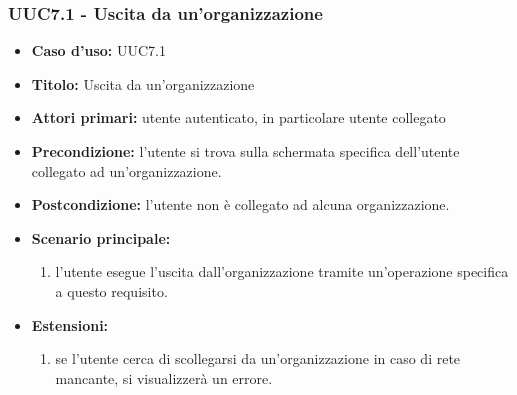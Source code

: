 \documentclass[casi-duso]{subfiles}
\begin{document}
\subsubsection{UUC7.1 - Uscita da un'organizzazione}
\label{subsub:UUC7.1utente}
\begin{itemize}
  \item \textbf{Caso d’uso:} UUC7.1
  \item \textbf{Titolo:} Uscita da un'organizzazione
  \item \textbf{Attori primari:} utente autenticato, in particolare utente collegato
  \item \textbf{Precondizione:} l'utente si trova sulla schermata specifica dell'utente collegato ad un'organizzazione.
  \item \textbf{Postcondizione:} l'utente non è collegato ad alcuna organizzazione.
  \item \textbf{Scenario principale:} 
  \begin{enumerate}
    \item l'utente esegue l'uscita dall'organizzazione tramite un'operazione specifica a questo requisito.
  \end{enumerate}  
  \item \textbf{Estensioni:} 
  \begin{enumerate}
    \item se l'utente cerca di scollegarsi da un'organizzazione in caso di rete mancante, si visualizzerà un errore.
  \end{enumerate}  
\end{itemize}

\end{document}
